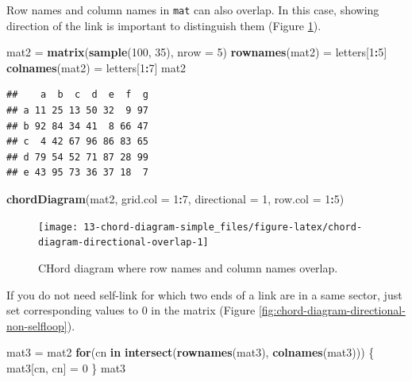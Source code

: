 \documentclass[]{book}
\newenvironment{Shaded}{\begin{snugshade}}{\end{snugshade}}
\newcommand{\KeywordTok}[1]{\textcolor[rgb]{0.13,0.29,0.53}{\textbf{#1}}}
\newcommand{\DataTypeTok}[1]{\textcolor[rgb]{0.13,0.29,0.53}{#1}}
\newcommand{\DecValTok}[1]{\textcolor[rgb]{0.00,0.00,0.81}{#1}}
\newcommand{\StringTok}[1]{\textcolor[rgb]{0.31,0.60,0.02}{#1}}
\newcommand{\ControlFlowTok}[1]{\textcolor[rgb]{0.13,0.29,0.53}{\textbf{#1}}}
\newcommand{\OperatorTok}[1]{\textcolor[rgb]{0.81,0.36,0.00}{\textbf{#1}}}
\newcommand{\NormalTok}[1]{#1}
\begin{document}
Row names and column names in \texttt{mat} can also overlap. In this
case, showing direction of the link is important to distinguish them
(Figure \ref{fig:chord-diagram-directional-overlap}).

\begin{Shaded}
\begin{Highlighting}[]
\NormalTok{mat2 =}\StringTok{ }\KeywordTok{matrix}\NormalTok{(}\KeywordTok{sample}\NormalTok{(}\DecValTok{100}\NormalTok{, }\DecValTok{35}\NormalTok{), }\DataTypeTok{nrow =} \DecValTok{5}\NormalTok{)}
\KeywordTok{rownames}\NormalTok{(mat2) =}\StringTok{ }\NormalTok{letters[}\DecValTok{1}\OperatorTok{:}\DecValTok{5}\NormalTok{]}
\KeywordTok{colnames}\NormalTok{(mat2) =}\StringTok{ }\NormalTok{letters[}\DecValTok{1}\OperatorTok{:}\DecValTok{7}\NormalTok{]}
\NormalTok{mat2}
\end{Highlighting}
\end{Shaded}

\begin{verbatim}
##    a  b  c  d  e  f  g
## a 11 25 13 50 32  9 97
## b 92 84 34 41  8 66 47
## c  4 42 67 96 86 83 65
## d 79 54 52 71 87 28 99
## e 43 95 73 36 37 18  7
\end{verbatim}

\begin{Shaded}
\begin{Highlighting}[]
\KeywordTok{chordDiagram}\NormalTok{(mat2, }\DataTypeTok{grid.col =} \DecValTok{1}\OperatorTok{:}\DecValTok{7}\NormalTok{, }\DataTypeTok{directional =} \DecValTok{1}\NormalTok{, }\DataTypeTok{row.col =} \DecValTok{1}\OperatorTok{:}\DecValTok{5}\NormalTok{)}
\end{Highlighting}
\end{Shaded}

\begin{figure}

{\centering \texttt{[image: 13-chord-diagram-simple\_files/figure-latex/chord-diagram-directional-overlap-1]} 

}

\caption{CHord diagram where row names and column names overlap.}\label{fig:chord-diagram-directional-overlap}
\end{figure}

If you do not need self-link for which two ends of a link are in a same
sector, just set corresponding values to 0 in the matrix (Figure
\ref{fig:chord-diagram-directional-non-selfloop}).

\begin{Shaded}
\begin{Highlighting}[]
\NormalTok{mat3 =}\StringTok{ }\NormalTok{mat2}
\ControlFlowTok{for}\NormalTok{(cn }\ControlFlowTok{in} \KeywordTok{intersect}\NormalTok{(}\KeywordTok{rownames}\NormalTok{(mat3), }\KeywordTok{colnames}\NormalTok{(mat3))) \{}
\NormalTok{    mat3[cn, cn] =}\StringTok{ }\DecValTok{0}
\NormalTok{\}}
\NormalTok{mat3}
\end{Highlighting}
\end{Shaded}
\end{document}
